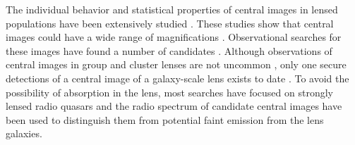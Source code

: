\documentclass[chicago]{emulateapj}
\begin{document}





The individual behavior and statistical properties of central images in lensed populations have been extensively studied \citep[e.g.][]{Wallington:93, Evans:02, Keeton:03}. These studies show that central images could have a wide range of magnifications \citep[e.g.,][]{Keeton:03}. 
Observational searches for these images have found a number of candidates \citep[e.g.][]{}. Although observations
of central images in group and cluster lenses are not uncommon \citep[e.g.,][]{Inada:05}, only one secure detections of a central image of a galaxy-scale lens exists to date \citep{Winn:04}. To avoid the possibility of absorption in the lens, most searches have focused on strongly lensed radio quasars and the radio spectrum of candidate central images have been used to distinguish them from potential faint emission from the lens galaxies.

\end{document}
